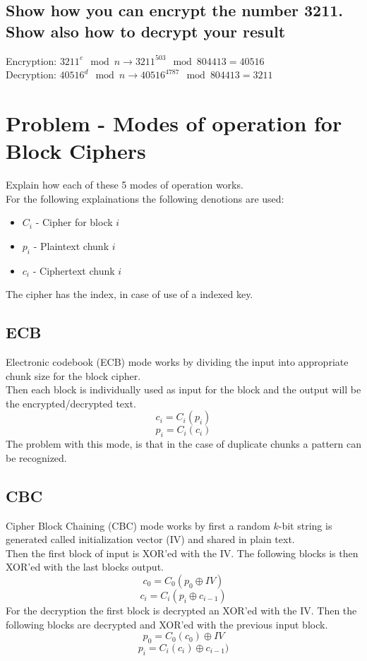 \documentclass[12pt, a4paper]{article}
\begin{document}
		\subsection{Show how you can encrypt the number 3211. Show also how to decrypt your result}
			Encryption: $3211^e\mod n\rightarrow 3211^{503}\mod 804413=40516$\\
			Decryption: $40516^d\mod n\rightarrow 40516^{4787}\mod 804413=3211$
	\section{Problem - Modes of operation for Block Ciphers}
		Explain how each of these 5 modes of operation works.\\
		For the following explainations the following denotions are used:
		\begin{itemize}
			\item $C_i$ - Cipher for block $i$
			\item $p_i$ - Plaintext chunk $i$
			\item $c_i$ - Ciphertext chunk $i$
		\end{itemize}
		The cipher has the index, in case of use of a indexed key.
		\subsection{ECB}
			Electronic codebook (ECB) mode works by dividing the input into appropriate chunk size for the block cipher.\\
			Then each block is individually used as input for the block and the output will be the encrypted/decrypted text.\\
			$$ c_i =C_i(p_i)$$
			$$ p_i =C_i(c_i)$$
			The problem with this mode, is that in the case of duplicate chunks a pattern can be recognized.
		\subsection{CBC}
			Cipher Block Chaining (CBC) mode works by first a random $k$-bit string is generated called initialization vector (IV) and shared in plain text.\\
			Then the first block of input is XOR'ed with the IV. The following blocks is then XOR'ed with the last blocks output.\\
			$$c_0=C_0(p_0\oplus IV)$$
			$$ c_i = C_i(p_i\oplus c_{i-1})$$
			For the decryption the first block is decrypted an XOR'ed with the IV. Then the following blocks are decrypted and XOR'ed with the previous input block.
			$$p_0=C_0(c_0)\oplus IV$$
			$$p_i=C_i(c_i)\oplus c_{i-1})$$
\end{document}
